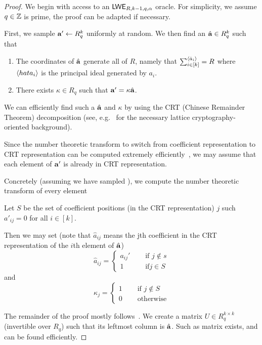 \documentclass[oribibl,envcountsect,envcountsame]{llncs}
\begin{document}
\begin{proof}
We begin with access to an $\mathsf{LWE}_{R,k-1,q,\alpha}$ oracle. 
For simplicity, we assume $q \in \mathbb{Z}$ is prime, the proof can be adapted if necessary. 

First, we sample $\mathbf{a}' \gets R_q^{k}$ uniformly at random. We then find an $\hat{\mathbf{a}} \in R_q^{k}$ 
such that 
\begin{enumerate}
\item The coordinates of $\hat{\mathbf{a}}$ generate all of $R$, namely that
$\sum_{i \in [k]}^{\langle\hat{a}_i\rangle} = R$ where $\langle hat{a}_i\rangle$ is the principal ideal generated by 
$a_i$. 
\item There exists $\kappa \in R_q$  such that $\mathbf{a}' = \kappa\hat{\mathbf{a}}$. 
\end{enumerate}

We can efficiently find such a $\hat{\mathbf{a}}$ and $\kappa$ by using the CRT (Chinese Remainder Theorem) 
decomposition (see, e.g.~\cite{cryptoeprint:2011:133} for the necessary lattice cryptography-oriented background).

Since the number theoretic transform to switch from coefficient representation to CRT representation
can be computed extremely efficiently~\cite{longa2016speeding}, we may assume that each element of 
$\mathbf{a}'$ is already in CRT representation. 

Concretely (assuming we have sampled ), we compute the number theoretic transform of every element 

Let $S$ be the set of coefficient positions (in the CRT representation) $j$ such 
$a'_{ij} = 0$ for all $i \in [k]$.

Then we may set (note that $\hat{a}_{ij}$ means the jth coefficient in the CRT representation of the $i$th element of $\hat{\mathbf{a}}$) 
\[
\hat{a}_{ij} = \begin{cases}a_{ij}'&\quad \text{ if } j \notin s\\
                    1&\quad \text{ if} j \in S\end{cases} 
\]
and 
\[\kappa_{j} = \begin{cases}1&\quad\text{ if } j \notin S\\
                            0&\quad\text{ otherwise}\end{cases}\]

The remainder of the proof mostly follows~\cite{DBLP:conf/stoc/BrakerskiLPRS13}. We create a 
matrix $U \in R_q^{k \times k}$ (invertible over $R_q$) such that its leftmost column is $\hat{\mathbf{a}}$. 
Such as matrix exists, and can be found efficiently. 




\end{proof}
\end{document}

